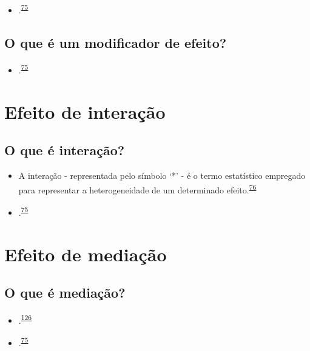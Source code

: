 \documentclass[
]{book}
\providecommand{\tightlist}{%
  \setlength{\itemsep}{0pt}\setlength{\parskip}{0pt}}
\begin{document}
\begin{itemize}
\tightlist
\item
  .\textsuperscript{\protect\hyperlink{ref-Bours2023}{75}}
\end{itemize}

\hypertarget{o-que-uxe9-um-modificador-de-efeito-1}{%
\subsection{O que é um modificador de efeito?}\label{o-que-uxe9-um-modificador-de-efeito-1}}

\begin{itemize}
\tightlist
\item
  .\textsuperscript{\protect\hyperlink{ref-Bours2023}{75}}
\end{itemize}

\hypertarget{interacao}{%
\section{Efeito de interação}\label{interacao}}

\hypertarget{o-que-uxe9-interauxe7uxe3o}{%
\subsection{O que é interação?}\label{o-que-uxe9-interauxe7uxe3o}}

\begin{itemize}
\item
  A interação - representada pelo símbolo `*' - é o termo estatístico empregado para representar a heterogeneidade de um determinado efeito.\textsuperscript{\protect\hyperlink{ref-Altman1996}{76}}
\item
  .\textsuperscript{\protect\hyperlink{ref-Bours2023}{75}}
\end{itemize}

\hypertarget{mediacao}{%
\section{Efeito de mediação}\label{mediacao}}

\hypertarget{o-que-uxe9-mediauxe7uxe3o}{%
\subsection{O que é mediação?}\label{o-que-uxe9-mediauxe7uxe3o}}

\begin{itemize}
\item
  .\textsuperscript{\protect\hyperlink{ref-Baron1986}{126}}
\item
  .\textsuperscript{\protect\hyperlink{ref-Bours2023}{75}}
\end{itemize}
\end{document}
